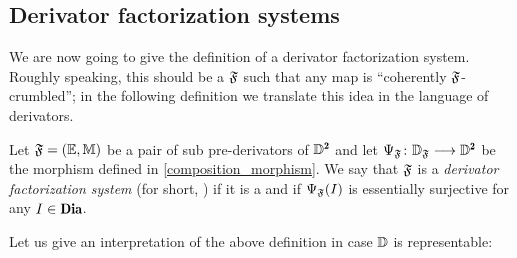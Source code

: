 \subsection{Derivator factorization systems} 




We are now going to give the definition of a derivator factorization system. Roughly speaking, this should be a \cpfs $\mathfrak{F}$ such that any map is ``coherently $\mathfrak{F}$-crumbled''; in the following definition we translate this idea in the language of derivators.


\begin{definition}\label{def_hfs}
Let $\mathfrak{F}=(\mathbb E,\mathbb M)$ be a pair of sub pre-derivators of $\D^\due$ and let $\Psi_\F\colon \D_\F\longrightarrow \D^{\due}$ be the morphism defined in \eqref{composition_morphism}. We say that $\mathfrak{F}$ is a \emph{derivator factorization system} (for short, \dfs) if it is a \cpfs and if $\Psi_{\mathfrak{F}}(I)$ is essentially surjective for any $I\in \Dia$.
\end{definition}

Let us give an interpretation of the above definition in case $\mathbb{D}$ is representable:

